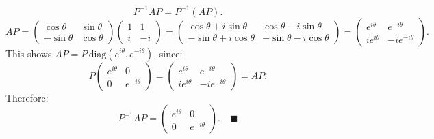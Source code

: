 \documentclass[12pt]{article}
\begin{document}
\[
P^{-1}AP = P^{-1}(AP).
\]
\[
AP = \begin{pmatrix} \cos\theta & \sin\theta \\ -\sin\theta & \cos\theta \end{pmatrix}\begin{pmatrix} 1 & 1 \\ i & -i \end{pmatrix} = \begin{pmatrix} \cos\theta + i\sin\theta & \cos\theta - i\sin\theta \\ -\sin\theta + i\cos\theta & -\sin\theta - i\cos\theta \end{pmatrix} = \begin{pmatrix} e^{i\theta} & e^{-i\theta} \\ ie^{i\theta} & -ie^{-i\theta} \end{pmatrix}.
\]
This shows $AP = P\,\text{diag}(e^{i\theta}, e^{-i\theta})$, since:
\[
P\begin{pmatrix} e^{i\theta} & 0 \\ 0 & e^{-i\theta} \end{pmatrix} = \begin{pmatrix} e^{i\theta} & e^{-i\theta} \\ ie^{i\theta} & -ie^{-i\theta} \end{pmatrix} = AP.
\]
Therefore:
\[
P^{-1}AP = \begin{pmatrix} e^{i\theta} & 0 \\ 0 & e^{-i\theta} \end{pmatrix}. \quad \blacksquare
\]
\end{document}
